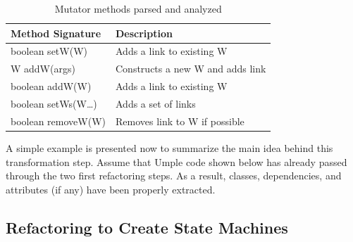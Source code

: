 \begin{table}
\caption{Mutator methods parsed and analyzed}
\label{table:mutators}
\centering
    \begin{tabular}{ll}
		\toprule
		\rowcolor[HTML]{BBDAFF}
        \textbf{Method Signature}   & \textbf{Description}    \\ 
        \hline
        boolean setW(W)   & Adds a link to existing W   		\\ 
        W addW(args)    & Constructs a new W and adds link      \\ 
        boolean addW(W)  & Adds a link to existing W            \\ 
        boolean setWs(W…)    & Adds a set of links              \\ 
        boolean removeW(W) &   Removes link to W if possible    \\
        \hline
    \end{tabular}
\end{table}
A simple example is presented now to summarize the main idea behind this transformation step. Assume that Umple code shown below has already passed through the two first refactoring steps. As a result, classes, dependencies, and attributes (if any) have been properly extracted. 

\subsection{Refactoring to Create State Machines}